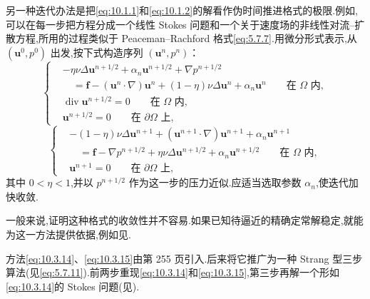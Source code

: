 另一种迭代办法是把\eqref{eq:10.1.1}和\eqref{eq:10.1.2}的解看作伪时间推进格式的极限.例如,可以在每一步把方程分成一个线性 Stokes 问题和一个关于速度场的非线性对流--扩散方程,所用的过程类似于 Peaceman--Rachford 格式\eqref{eq:5.7.7}.用微分形式表示,从 \((\boldsymbol{u}^0,p^0)\) 出发,按下式构造序列 \((\boldsymbol{u}^n,p^n)\)：
\begin{equation}\label{eq:10.3.14}
  \left\{
  \begin{aligned}
    &-\eta\nu\Delta\boldsymbol{u}^{n+1/2}+\alpha_n\boldsymbol{u}^{n+1/2}+\nabla p^{n+1/2}\\
    &\quad=\boldsymbol{f}-(\boldsymbol{u}^n\cdot\nabla)\boldsymbol{u}^n
       +(1-\eta)\nu\Delta\boldsymbol{u}^n+\alpha_n\boldsymbol{u}^n
         \qquad\text{在 }\Omega\text{ 内},\\
    &\operatorname{div}\boldsymbol{u}^{n+1/2}=0\qquad\text{在 }\Omega\text{ 内},\\
    &\boldsymbol{u}^{n+1/2}=0\qquad\text{在 }\partial\Omega\text{ 上},
  \end{aligned}
  \right.
\end{equation}
\begin{equation}\label{eq:10.3.15}
  \left\{
  \begin{aligned}
    &-(1-\eta)\nu\Delta\boldsymbol{u}^{n+1}+(\boldsymbol{u}^{n+1}\cdot\nabla)\boldsymbol{u}^{n+1}
       +\alpha_n\boldsymbol{u}^{n+1}\\
    &\quad=\boldsymbol{f}-\nabla p^{n+1/2}+\eta\nu\Delta\boldsymbol{u}^{n+1/2}
        +\alpha_n\boldsymbol{u}^{n+1/2}\qquad\text{在 }\Omega\text{ 内},\\
    &\boldsymbol{u}^{n+1}=0\qquad\text{在 }\partial\Omega\text{ 上},
  \end{aligned}
  \right.
\end{equation}
其中 \(0<\eta<1\),并以 \(p^{n+1/2}\) 作为这一步的压力近似.应适当选取参数 \(\alpha_n\),使迭代加快收敛.

一般来说,证明这种格式的收敛性并不容易.如果已知待逼近的精确定常解稳定,就能为这一方法提供依据,例如见.

方法\eqref{eq:10.3.14}、\eqref{eq:10.3.15}由第 255 页引入.后来将它推广为一种 Strang 型三步算法(见\eqref{eq:5.7.11}).前两步重现\eqref{eq:10.3.14}和\eqref{eq:10.3.15},第三步再解一个形如\eqref{eq:10.3.14}的 Stokes 问题(见).

